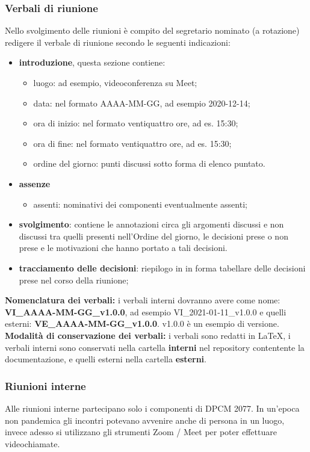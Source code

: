 \subsubsection{Verbali di riunione}
Nello svolgimento delle riunioni è compito del segretario nominato (a rotazione) redigere il verbale di riunione secondo le seguenti indicazioni:
\begin{itemize}
\item{\textbf{introduzione}, questa sezione contiene:}
	\begin{itemize}
	\item{luogo: ad esempio, videoconferenza su Meet;}
	\item{data: nel formato AAAA-MM-GG, ad esempio 2020-12-14;}
	\item{ora di inizio:  nel formato ventiquattro ore, ad es. 15:30;}
	\item{ora di fine:  nel formato ventiquattro ore, ad es. 15:30;}
	\item{ordine del giorno: punti discussi sotto forma di elenco puntato.}
	\end{itemize}
\item{\textbf{assenze}}
	\begin{itemize}
	\item{assenti: nominativi dei componenti eventualmente assenti;}
	\end{itemize}
\item{\textbf{svolgimento}: contiene le annotazioni circa gli argomenti discussi e non discussi tra quelli presenti nell’Ordine del giorno, le decisioni prese o non prese e le motivazioni che hanno portato a tali decisioni.}
\item{\textbf{tracciamento delle decisioni}: riepilogo in in forma tabellare delle decisioni prese nel corso della riunione;}
\end{itemize}
\textbf{Nomenclatura dei verbali: } i verbali interni dovranno avere come nome: \textbf{VI\_AAAA-MM-GG\_v1.0.0}, ad esempio VI\_2021-01-11\_v1.0.0 e quelli esterni: \textbf{VE\_AAAA-MM-GG\_v1.0.0}. v1.0.0 è un esempio di versione.\\
\textbf{Modalità di conservazione dei verbali:} i verbali sono redatti in \LaTeX, i verbali interni sono conservati nella cartella \textbf{interni} nel repository  contentente la documentazione, e quelli esterni nella cartella \textbf{esterni}.

\subsubsection{Riunioni interne}
Alle riunioni interne partecipano solo i componenti di DPCM 2077.
In un'epoca non pandemica gli incontri potevano avvenire anche di persona in un luogo, invece adesso si utilizzano gli strumenti Zoom / Meet per poter effettuare videochiamate.

